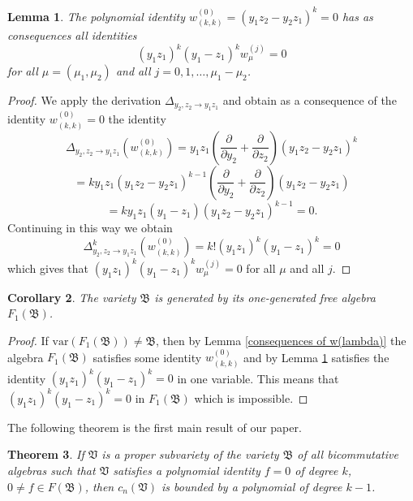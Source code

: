 \documentclass{amsart}[12pt]
\newtheorem{theorem}{Theorem}[section]
\newtheorem{lemma}[theorem]{Lemma}
\newtheorem{corollary}[theorem]{Corollary}
\theoremstyle{definition}
\begin{document}
\begin{lemma}\label{consequences in one variable}
The polynomial identity $w_{(k,k)}^{(0)}=(y_1z_2-y_2z_1)^k=0$ has as consequences all identities
\[
(y_1z_1)^k(y_1-z_1)^kw_{\mu}^{(j)}=0
\]
for all $\mu=(\mu_1,\mu_2)$ and all $j=0,1,\ldots,\mu_1-\mu_2$.
\end{lemma}

\begin{proof}
We apply the derivation $\Delta_{y_2,z_2\to y_1z_1}$ and obtain as a consequence of the identity $w_{(k,k)}^{(0)}=0$ the identity
\[
\Delta_{y_2,z_2\to y_1z_1}(w_{(k,k)}^{(0)})=y_1z_1\left(\frac{\partial}{\partial y_2}+\frac{\partial}{\partial z_2}\right)(y_1z_2-y_2z_1)^k
\]
\[
=ky_1z_1(y_1z_2-y_2z_1)^{k-1}\left(\frac{\partial}{\partial y_2}+\frac{\partial}{\partial z_2}\right)(y_1z_2-y_2z_1)
\]
\[
=ky_1z_1(y_1-z_1)(y_1z_2-y_2z_1)^{k-1}=0.
\]
Continuing in this way we obtain
\[
\Delta_{y_2,z_2\to y_1z_1}^k(w_{(k,k)}^{(0)})=k!(y_1z_1)^k(y_1-z_1)^k=0
\]
which gives that $(y_1z_1)^k(y_1-z_1)^kw_{\mu}^{(j)}=0$ for all $\mu$ and all $j$.
\end{proof}

\begin{corollary}\label{generating by free algebra of rank 1}
The variety $\mathfrak B$ is generated by its one-generated free algebra $F_1({\mathfrak B})$.
\end{corollary}

\begin{proof}
If $\text{var}(F_1({\mathfrak B}))\not=\mathfrak B$, then by Lemma \ref{consequences of w(lambda)} the algebra
$F_1({\mathfrak B})$ satisfies some identity $w_{(k,k)}^{(0)}$ and by Lemma \ref{consequences in one variable} satisfies the identity
$(y_1z_1)^k(y_1-z_1)^k=0$ in one variable. This means that $(y_1z_1)^k(y_1-z_1)^k=0$ in $F_1({\mathfrak B})$
which is impossible.
\end{proof}

The following theorem is the first main result of our paper.


\begin{theorem}\label{main theorem}
If $\mathfrak V$ is a proper subvariety of the variety $\mathfrak B$ of all bicommutative algebras such that
$\mathfrak V$ satisfies a polynomial identity $f=0$ of degree $k$, $0\not=f\in F({\mathfrak B})$, then
$c_n({\mathfrak V})$ is bounded by a polynomial of degree $k-1$.
\end{theorem}
\end{document}
